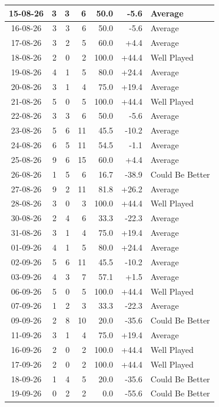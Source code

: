 \documentclass[journal]{IEEEtran}
\numberwithin{equation}{subsection}
\begin{document}
\begin{longtable}{|c|r|r|r|r|r|l|}
15-08-26 & 3 & 3 & 6 & 50.0 & -5.6 & Average\\ \hline
16-08-26 & 3 & 3 & 6 & 50.0 & -5.6 & Average\\ \hline
17-08-26 & 3 & 2 & 5 & 60.0 & +4.4 & Average\\ \hline
18-08-26 & 2 & 0 & 2 & 100.0 & +44.4 & Well Played\\ \hline
19-08-26 & 4 & 1 & 5 & 80.0 & +24.4 & Average\\ \hline
20-08-26 & 3 & 1 & 4 & 75.0 & +19.4 & Average\\ \hline
21-08-26 & 5 & 0 & 5 & 100.0 & +44.4 & Well Played\\ \hline
22-08-26 & 3 & 3 & 6 & 50.0 & -5.6 & Average\\ \hline
23-08-26 & 5 & 6 & 11 & 45.5 & -10.2 & Average\\ \hline
24-08-26 & 6 & 5 & 11 & 54.5 & -1.1 & Average\\ \hline
25-08-26 & 9 & 6 & 15 & 60.0 & +4.4 & Average\\ \hline
26-08-26 & 1 & 5 & 6 & 16.7 & -38.9 & Could Be Better\\ \hline
27-08-26 & 9 & 2 & 11 & 81.8 & +26.2 & Average\\ \hline
28-08-26 & 3 & 0 & 3 & 100.0 & +44.4 & Well Played\\ \hline
30-08-26 & 2 & 4 & 6 & 33.3 & -22.3 & Average\\ \hline
31-08-26 & 3 & 1 & 4 & 75.0 & +19.4 & Average\\ \hline
01-09-26 & 4 & 1 & 5 & 80.0 & +24.4 & Average\\ \hline
02-09-26 & 5 & 6 & 11 & 45.5 & -10.2 & Average\\ \hline
03-09-26 & 4 & 3 & 7 & 57.1 & +1.5 & Average\\ \hline
06-09-26 & 5 & 0 & 5 & 100.0 & +44.4 & Well Played\\ \hline
07-09-26 & 1 & 2 & 3 & 33.3 & -22.3 & Average\\ \hline
09-09-26 & 2 & 8 & 10 & 20.0 & -35.6 & Could Be Better\\ \hline
11-09-26 & 3 & 1 & 4 & 75.0 & +19.4 & Average\\ \hline
16-09-26 & 2 & 0 & 2 & 100.0 & +44.4 & Well Played\\ \hline
17-09-26 & 2 & 0 & 2 & 100.0 & +44.4 & Well Played\\ \hline
18-09-26 & 1 & 4 & 5 & 20.0 & -35.6 & Could Be Better\\ \hline
19-09-26 & 0 & 2 & 2 & 0.0 & -55.6 & Could Be Better\\ \hline

\end{longtable}
\end{document}
